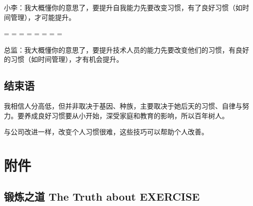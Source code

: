 小李：我大概懂你的意思了，要提升自我能力先要改变习惯，有了良好习惯（如时间管理），才可能提升。\\

\begin{description}
\tightlist
\item[]
= = = = = = = =
\end{description}

总监：我大概懂你的意思了，要提升技术人员的能力先要改变他们的习惯，有良好的习惯（如时间管理），才有机会提升。\\


\hypertarget{ux7ed3ux675fux8bed}{%
\subsection{结束语}\label{ux7ed3ux675fux8bed}}


我相信人分高低，但并非取决于基因、种族，主要取决于她后天的习惯、自律与努力。要养成良好习惯要从小开始，深受家庭和教育的影响，所以百年树人。

与公司改进一样，改变个人习惯很难，这些技巧可以帮助个人改善。

\hypertarget{ux9644ux4ef6}{%
\section{附件}\label{ux9644ux4ef6}}


\hypertarget{ux953bux70bcux4e4bux9053-the-truth-about-exercise}{%
\subsection{锻炼之道 The Truth about
EXERCISE}\label{ux953bux70bcux4e4bux9053-the-truth-about-exercise}}

